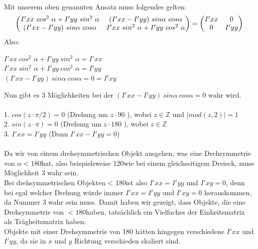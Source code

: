 \documentclass{ezb}
\begin{document}
\linebreak
\\
Mit unserem oben genannten Ansatz muss folgendes gelten:\\
\begin{equation}
\begin{pmatrix}
I'xx \ cos^{2}$ $\alpha + I'yy \ sin^{2}$ $\alpha & (I'xx - I'yy) \ sin \alpha \ cos \alpha \\
(I'xx - I'yy) \ sin \alpha \ cos \alpha & I'xx \ sin^{2}$ $\alpha + I'yy \ cos^{2}$ $\alpha
\end{pmatrix}
=
\begin{pmatrix}
I'xx & 0 \\
0 & I'yy
\end{pmatrix}
\end{equation}
\newpage
Also:\\
\begin{center}
$I'xx \ cos^{2}$ $\alpha + I'yy \ sin^{2}$ $\alpha = I'xx$\\
$I'xx \ sin^{2}$ $\alpha + I'yy \ cos^{2}$ $\alpha = I'yy$\\
$ (I'xx - I'yy) \ sin \alpha \ cos \alpha =0 = I'xy $\\
\end{center}
Nun gibt es 3 Möglichkeiten bei der $ (I'xx - I'yy) \ sin \alpha \ cos \alpha =0 $ wahr wird.\\
\\
1. $cos(z \cdot \pi / 2) = 0$ (Drehung um $z \cdot 90$ \degree), wobei $z \in \mathbb{Z}$ und $|mod(z,2)| = 1$\\
2. $sin(z \cdot \pi) = 0$ (Drehung um $z \cdot 180$ \degree), wobei $z \in \mathbb{Z}$\\
3. $I'xx = I'yy$ (Dann $I'xx - I'yy = 0$)\\
\\
Da wir von einem drehsymmetrischen Objekt ausgehen, was eine Drehsymmetrie von $\alpha < 180$\degree hat, also beispielsweise 120\degree wie bei einem gleichseitigem Dreieck, muss Möglichkeit 3 wahr sein.\\
Bei drehsymmetrischen Objekten < 180\degree ist also $I'xx = I'yy$ und $I'xy = 0$, denn bei egal welcher Drehung würde immer  $I'xx = I'yy$ und $I'xy = 0$ herauskommen, da Nummer 3 wahr sein muss. Damit haben wir gezeigt, dass Objekte, die eine Drehsymmetrie von $< 180$\degree haben, tatsächlich ein Vielfaches der Einheitsmatrix als Trägheitsmatrix haben.\\
Objekte mit einer Drehsymmetrie von 180 hätten hingegen verschiedene $I'xx$ und $I'yy$, da sie in $x$ und $y$ Richtung verschieden skaliert sind.\\
\end{document}
